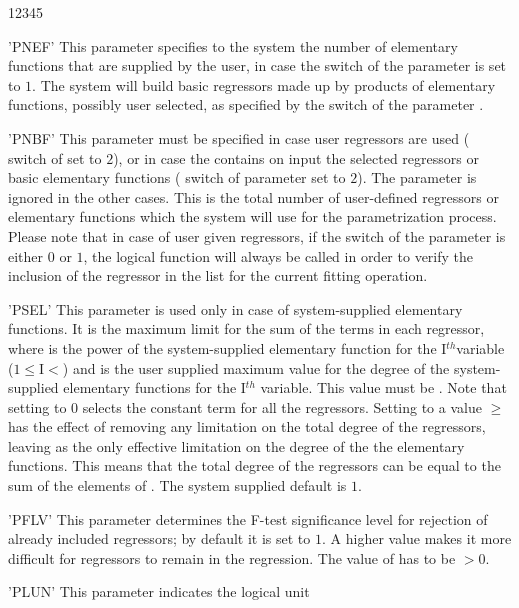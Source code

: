 \begin{DLtt}{12345}
\item['PNEF'] This parameter specifies to the system the number of
elementary functions that are supplied by the user, in case the switch
 of the  parameter is set to $1$.
The system will build  basic
regressors made up by products of  elementary functions, possibly
user selected, as specified by the switch  of the parameter .
\item['PNBF'] This parameter must be specified in case user regressors are used
( switch of  set to $2$), or in case the  contains
on input the selected regressors or basic elementary functions
( switch of  parameter set to $2$).
The parameter is ignored in the other cases.
This is the total number of user-defined regressors or elementary functions
which the system will use for the parametrization process.
Please note that in case of user given regressors,
if the  switch of the  parameter is
either $0$ or $1$, the logical function 
will always be called
in order to verify the inclusion of the regressor 
in the list for the current fitting operation.
\item['PSEL'] This parameter is used only in case of system-supplied
elementary functions.
It is the maximum limit for the sum of the terms
 in each regressor, where  is the power
of the system-supplied elementary function for the I$^{th}$variable
($1\leq$I$<$) and  is the user supplied maximum
value for the degree of the system-supplied elementary functions for
the I$^{th}$ variable.
This value must be . Note that setting
 to $0$ selects the constant term for all the regressors.
Setting  to a value $\geq$ has the effect of removing
any limitation on the total degree of the regressors, leaving 
as the only effective limitation on the degree of the the elementary functions.
This means that the total degree of the regressors can be equal to the sum of
the  elements of . The system supplied
default is $1$.
\item['PFLV'] This parameter determines the F-test significance level for
rejection of already included regressors; by default it is set to $1$.
A higher value makes it more difficult for regressors to remain in the regression. 
The value of  has to be $>0$.
\item['PLUN'] This parameter indicates the logical unit

\end{DLtt}
